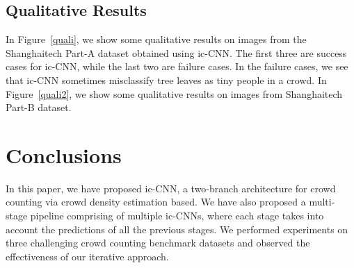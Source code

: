 \documentclass[runningheads]{llncs}
\begin{document}
\subsection{Qualitative Results}
In Figure~\ref{quali}, we show some qualitative results on images from the Shanghaitech Part-A dataset obtained using ic-CNN. The first three are success cases for ic-CNN, while the last two are failure cases. In the failure cases, we see that ic-CNN sometimes misclassify tree leaves as tiny people in a crowd. In Figure~\ref{quali2}, we show some qualitative results on images from Shanghaitech Part-B dataset.


\section{Conclusions}
In this paper, we have proposed ic-CNN, a two-branch architecture for crowd counting via crowd density estimation based. We have also proposed a multi-stage pipeline comprising of multiple ic-CNNs, where each stage takes into account the predictions of all the previous stages. We performed experiments on three challenging crowd counting benchmark datasets and observed the effectiveness of our iterative approach.
\end{document}
